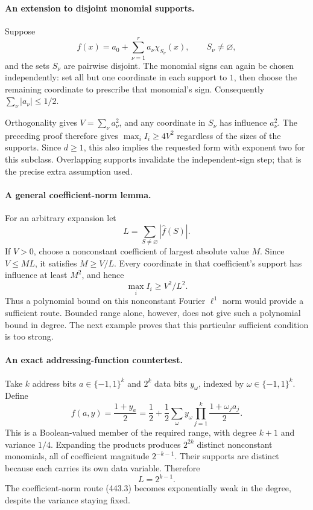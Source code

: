 \documentclass[11pt]{article}
\begin{document}
\paragraph{An extension to disjoint monomial supports.}
Suppose
\[
 f(x)=a_0+\sum_{\nu=1}^r a_\nu\chi_{S_\nu}(x),
 \qquad S_\nu\ne\varnothing,
\]
and the sets $S_\nu$ are pairwise disjoint. The monomial signs can again be chosen independently: set all but one coordinate in each support to $1$, then choose the remaining coordinate to prescribe that monomial's sign. Consequently $\sum_\nu|a_\nu|\le1/2$.

Orthogonality gives $V=\sum_\nu a_\nu^2$, and any coordinate in $S_\nu$ has influence $a_\nu^2$. The preceding proof therefore gives $\max_iI_i\ge4V^2$ regardless of the sizes of the supports. Since $d\ge1$, this also implies the requested form with exponent two for this subclass. Overlapping supports invalidate the independent-sign step; that is the precise extra assumption used.

\paragraph{A general coefficient-norm lemma.}
For an arbitrary expansion let
\[
 L=\sum_{S\ne\varnothing}|\widehat f(S)|.
\]
If $V>0$, choose a nonconstant coefficient of largest absolute value $M$. Since $V\le ML$, it satisfies $M\ge V/L$. Every coordinate in that coefficient's support has influence at least $M^2$, and hence
\[
 \max_i I_i\ge V^2/L^2.
 \tag{443.3}
\]
Thus a polynomial bound on this nonconstant Fourier $\ell^1$ norm would provide a sufficient route. Bounded range alone, however, does not give such a polynomial bound in degree. The next example proves that this particular sufficient condition is too strong.

\paragraph{An exact addressing-function countertest.}
Take $k$ address bits $a\in\{-1,1\}^k$ and $2^k$ data bits $y_\omega$, indexed by $\omega\in\{-1,1\}^k$. Define
\[
 f(a,y)=\frac{1+y_a}{2}
 =\frac12+\frac12\sum_\omega y_\omega
                \prod_{j=1}^k\frac{1+\omega_j a_j}{2}.
 \tag{443.4}
\]
This is a Boolean-valued member of the required range, with degree $k+1$ and variance $1/4$. Expanding the products produces $2^{2k}$ distinct nonconstant monomials, all of coefficient magnitude $2^{-k-1}$. Their supports are distinct because each carries its own data variable. Therefore
\[
 L=2^{k-1}.
\]
The coefficient-norm route (443.3) becomes exponentially weak in the degree, despite the variance staying fixed.
\end{document}
